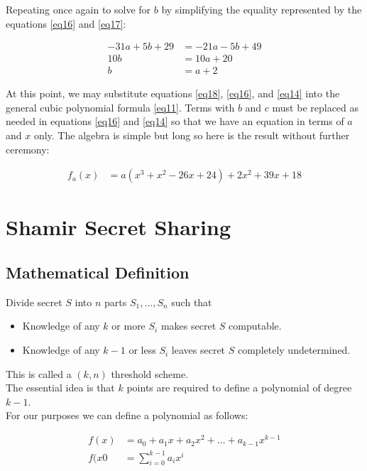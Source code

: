 \documentclass[preview,border=3mm]{article}
\begin{document}
\noindent
Repeating once again to solve for $b$ by simplifying the equality represented
by the equations \ref{eq16} and \ref{eq17}:

\begin{align}
    -31a + 5b + 29 &= -21a - 5b + 49 \nonumber \\
    10b &= 10a + 20 \nonumber \\
    b &= a + 2 \label{eq18}
\end{align}

\noindent
At this point, we may substitute equations \ref{eq18}, \ref{eq16}, and \ref{eq14}
into the general cubic polynomial formula \ref{eq11}. Terms with $b$ and $c$
must be replaced as needed in equations \ref{eq16} and \ref{eq14} so that we
have an equation in terms of $a$ and $x$ only. The algebra is simple but long
so here is the result without further ceremony:

\begin{align}
    f_a(x) &= a(x^3 + x^2 - 26x + 24) + 2x^2 + 39x + 18 \label{eq19}
\end{align}


\section{Shamir Secret Sharing}

\subsection{Mathematical Definition}

Divide secret $S$ into $n$ parts $S_1,\ldots,S_n$ such that

\begin{itemize}
    \item Knowledge of any $k$ or more $S_i$ makes secret $S$ computable.
    \item Knowledge of any $k-1$ or less $S_i$ leaves secret $S$ completely undetermined.
\end{itemize}

\noindent
This is called a $(k,n)$ threshold scheme.\\

\noindent
The essential idea is that $k$ points are required to define a polynomial of
degree $k-1$.\\

\noindent
For our purposes we can define a polynomial as follows:

\begin{align*}
    f(x) &= a_0 + a_1x + a_2x^2 + \ldots + a_{k-1}x^{k-1} \\
    f(x0 &= \sum_{i=0}^{k-1} a_ix^i
\end{align*}
\end{document}
